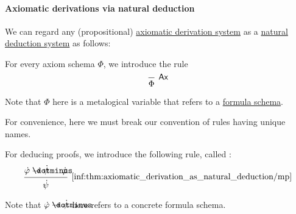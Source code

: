 \paragraph{Axiomatic derivations via natural deduction}

\begin{remark}\label{rem:axiomatic_derivation_system_as_natural_deduction_system}
  We can regard any (propositional) \hyperref[def:axiomatic_derivation_system]{axiomatic derivation system} as a \hyperref[def:abstract_propositional_natural_deduction_system]{natural deduction system} as follows:
  \begin{thmenum}
     For every axiom schema \( \Phi \), we introduce the rule
    \begin{equation*}
      \begin{prooftree}
        \infer0[\logic{Ax}]{ \Phi }
      \end{prooftree}
    \end{equation*}

    Note that \( \Phi \) here is a metalogical variable that refers to a \hyperref[def:propositional_formula_schema]{formula schema}.

    For convenience, here we must break our convention of rules having unique names.

     For deducing proofs, we introduce the following rule, called :
    \begin{equation*}\taglabel[\ensuremath{ \logic{MP} }]{inf:thm:axiomatic_derivation_as_natural_deduction/mp}
      \begin{prooftree}
        \hypo{ \syn\varphi \synimplies \syn\psi }
        \hypo{ \syn\varphi }
        \infer2[\ref{inf:thm:axiomatic_derivation_as_natural_deduction/mp}]{ \syn\psi }
      \end{prooftree}
    \end{equation*}

    Note that \( \syn\varphi \synimplies \syn\psi \) here refers to a concrete formula schema.
  \end{thmenum}
\end{remark}

